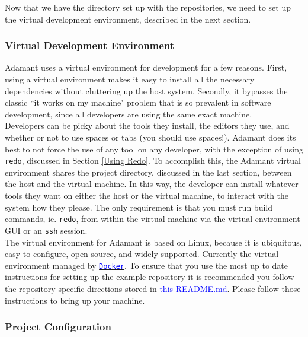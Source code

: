 Now that we have the directory set up with the repositories, we need to set up the virtual development environment, described in the next section.

\subsubsection{Virtual Development Environment}

Adamant uses a virtual environment for development for a few reasons. First, using a virtual environment makes it easy to install all the necessary dependencies without cluttering up the host system. Secondly, it bypasses the classic ``it works on my machine" problem that is so prevalent in software development, since all developers are using the same exact machine. \\

Developers can be picky about the tools they install, the editors they use, and whether or not to use spaces or tabs (you should use spaces!). Adamant does its best to not force the use of any tool on any developer, with the exception of using \texttt{redo}, discussed in Section \ref{Using Redo}. To accomplish this, the Adamant virtual environment shares the project directory, discussed in the last section, between the host and the virtual machine. In this way, the developer can install whatever tools they want on either the host or the virtual machine, to interact with the system how they please. The only requirement is that you must run build commands, ie. \texttt{redo}, from within the virtual machine via the virtual environment GUI or an \texttt{ssh} session. \\

The virtual environment for Adamant is based on Linux, because it is ubiquitous, easy to configure, open source, and widely supported. Currently the virtual environment managed by \href{https://www.docker.com/}{\texttt{\textcolor{blue}{Docker}}}. To ensure that you use the most up to date instructions for setting up the example repository it is recommended you follow the repository specific directions stored in \href{https://github.com/lasp/adamant_example/blob/main/docker/README.md}{\textcolor{blue}{this README.md}}. Please follow those instructions to bring up your machine. \\

\subsubsection{Project Configuration} \label{Project Configuration}

